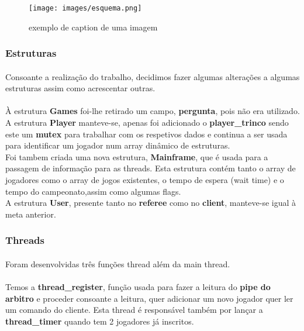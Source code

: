 \documentclass[letterpaper, 11pt]{article}
\begin{document}
\begin{figure}[htbp]
\centering
\texttt{[image: images/esquema.png]}
\caption{\label{fig:orgf65786b}
exemplo de caption de uma imagem}
\end{figure}


\subsubsection{Estruturas}
\label{sec:org9ebf53f}

\paragraph{}
Consoante a realização do trabalho, decidimos fazer algumas alterações a algumas estruturas assim como acrescentar outras.
\paragraph{}
À estrutura \textbf{Games} foi-lhe retirado um campo, \textbf{pergunta}, pois não era utilizado.\\
A estrutura \textbf{Player} manteve-se, apenas foi adicionado o \textbf{player\_trinco} sendo este um \textbf{mutex} para trabalhar com os respetivos dados e continua a ser usada para identificar um jogador num array dinâmico de estruturas.\\
Foi tambem criada uma nova estrutura, \textbf{Mainframe}, que é usada para a passagem de informação para as threads. Esta estrutura contém tanto o array de jogadores como o array de jogos existentes, o tempo de espera (wait time) e o tempo do campeonato,assim como algumas flags. \\
A estrutura \textbf{User}, presente tanto no \textbf{referee} como no \textbf{client}, manteve-se igual à meta anterior.

\subsubsection{Threads}
\label{sec:org5be851a}

\paragraph{}
Foram desenvolvidas três funções thread além da main thread.
\paragraph{}
Temos a \textbf{thread\_register}, função usada para fazer a leitura do \textbf{pipe do arbitro} e proceder consoante a leitura, quer adicionar um novo jogador quer ler um comando do cliente. Esta thread é responsável também por lançar a \textbf{thread\_timer} quando tem 2 jogadores já inscritos.
\end{document}
